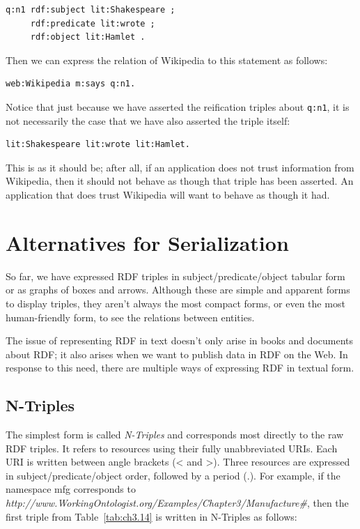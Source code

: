 \begin{lstlisting}
q:n1 rdf:subject lit:Shakespeare ; 
     rdf:predicate lit:wrote ; 
     rdf:object lit:Hamlet .
\end{lstlisting}

Then we can express the relation of Wikipedia to this statement as
follows:

\begin{lstlisting}
web:Wikipedia m:says q:n1.
\end{lstlisting}

Notice that just because we have asserted the reification triples about
\texttt{q:n1}, it is not necessarily the case that we have also asserted the
triple itself:

\begin{lstlisting}
lit:Shakespeare lit:wrote lit:Hamlet.
\end{lstlisting}

This is as it should be; after all, if an application does not trust
information from Wikipedia, then it should not behave as though that
triple has been asserted. An application that does trust Wikipedia will
want to behave as though it had.

\section{Alternatives for Serialization}
\label{serialization}
So far, we have expressed RDF triples in subject/predicate/object
tabular form or as graphs of boxes and arrows. Although these are simple
and apparent forms to display triples, they aren't always the most
compact forms, or even the most human-friendly form, to see the
relations between entities.

The issue of representing RDF in text doesn't only arise in books and
documents about RDF; it also arises when we want to publish data in RDF
on the Web. In response to this need, there are multiple ways of
expressing RDF in textual form.

\subsection{N-Triples}

The simplest form is called \emph{N-Triples} and corresponds most directly to
the raw RDF triples. It refers to resources using their fully
unabbreviated URIs. Each URI is written between angle brackets
(\textless{} and \textgreater{}). Three resources are expressed in
subject/predicate/object order, followed by a period (.). For example,
if the namespace mfg corresponds to
\emph{http://www.WorkingOntologist.org/Examples/Chapter3/Manufacture\#}, then the first triple from Table~\ref{tab:ch3.14} is written
in N-Triples as follows:


